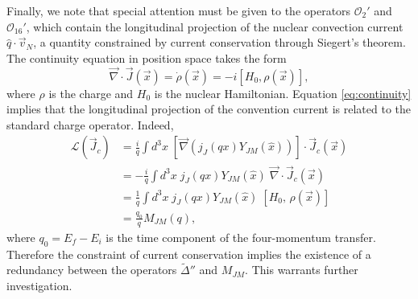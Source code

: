 \documentclass{book}[letterpaper,12pt]
\begin{document}
Finally, we note that special attention must be given to the operators $\mathcal{O}_2'$ and $\mathcal{O}_{16}'$, which contain the longitudinal projection of the nuclear convection current $\hat{q}\cdot\vec{v}_N$, a quantity constrained by current conservation through Siegert's theorem\cite{PhysRev.52.787}. The continuity equation in position space takes the form
\begin{equation}
\vec{\nabla}\cdot\vec{J}(\vec{x})=\dot{\rho}(\vec{x})=-i\left[H_0,\rho(\vec{x})\right],
\label{eq:continuity}
\end{equation}
where $\rho$ is the charge and $H_0$ is the nuclear Hamiltonian. Equation \ref{eq:continuity} implies that the longitudinal projection of the convention current is related to the standard charge operator. Indeed,
\begin{equation}
\begin{split}
\mathcal{L}(\vec{J}_c)&=\frac{i}{q}\int d^3x\;\left[\vec{\nabla}\left(j_J(qx)Y_{JM}(\hat{x})\right)\right]\cdot\vec{J}_c(\vec{x})\\
&=-\frac{i}{q}\int d^3x\;j_J(qx)Y_{JM}(\hat{x})\;\vec{\nabla}\cdot\vec{J}_c(\vec{x})\\
&=\frac{1}{q}\int d^3x\;j_J(qx)Y_{JM}(\hat{x})\;\left[H_0,\,\rho(\vec{x})\right]\\
&=\frac{q_0}{q}M_{JM}(q),
\end{split}
\end{equation}
where $q_0=E_f-E_i$ is the time component of the four-momentum transfer. Therefore the constraint of current conservation implies the existence of a redundancy between the operators $\tilde{\Delta}''$ and $M_{JM}$. This warrants further investigation.
\end{document}
